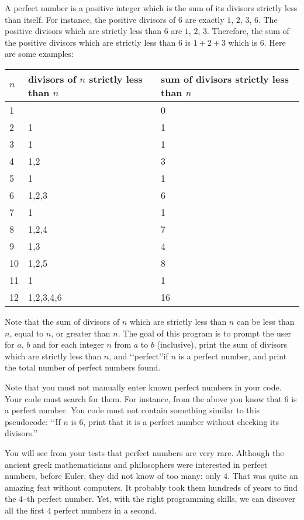 A perfect number is a positive integer which is the sum of its divisors
strictly less than itself. For instance, the positive divisors of $6$ are
exactly $1$, $2$, $3$, $6$. The positive divisors which are strictly less than
$6$ are $1$, $2$, $3$. Therefore, the sum of the positive divisors which are
strictly less than $6$ is $1 + 2 + 3$  which is $6$. Here are some examples:

\begin{longtable}{|l|l|l|}
\hline
$n$ & divisors of $n$ strictly less than $n$ & sum of divisors strictly less
than $n$ \\
\hline 
1 &   & 0 \\
2 & 1 & 1 \\
3 & 1 & 1 \\
4 & 1,2 & 3 \\
5 & 1 & 1 \\
6 & 1,2,3 & 6 \\
7 & 1 & 1 \\
8 & 1,2,4 & 7 \\
9 & 1,3 & 4 \\
10 & 1,2,5 & 8 \\
11 & 1 & 1 \\
12 & 1,2,3,4,6 & 16 \\
\hline
\end{longtable}

Note that the sum of divisors of $n$ which are strictly less than $n$ can be
less than $n$, equal to $n$, or greater than $n$. The goal of this program is
to prompt the user for $a$, $b$ and for each integer $n$ from $a$ to $b$
(inclusive), print the sum of divisors which are strictly less than $n$, and
\lq\lq perfect\rq\rq if $n$ is a perfect number, and print the total number of
perfect numbers found.

Note that you must not manually enter known perfect numbers in your code. Your
code must search for them. For instance, from the above you know that $6$ is a
perfect number. You code must not contain something similar to this pseudocode:
\lq\lq If $n$ is $6$, print that it is a perfect number without checking its
divisors.\rq\rq

You will see from your tests that perfect numbers are very rare. Although the
ancient greek mathematicians and philosophers were interested in perfect
numbers, before Euler, they did not know of too many: only $4$. That was quite
an amazing feat without computers. It probably took them hundreds of years to
find the $4$--th perfect number. Yet, with the right programming skills, we
can discover all the first $4$ perfect numbers in a second.

